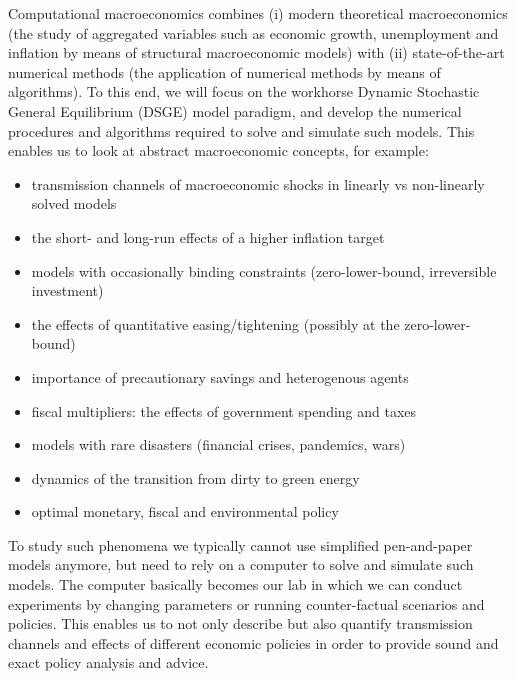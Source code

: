 Computational macroeconomics combines (i) modern theoretical macroeconomics
  (the study of aggregated variables such as economic growth, unemployment and inflation
  by means of structural macroeconomic models)
  with (ii) state-of-the-art numerical methods (the application of numerical methods by means of algorithms).
To this end, we will focus on the workhorse Dynamic Stochastic General Equilibrium (DSGE) model paradigm,
  and develop the numerical procedures and algorithms required to solve and simulate such models.
This enables us to look at abstract macroeconomic concepts, for example:
\begin{itemize}
\item transmission channels of macroeconomic shocks in linearly vs non-linearly solved models
\item the short- and long-run effects of a higher inflation target
\item models with occasionally binding constraints (zero-lower-bound, irreversible investment)
\item the effects of quantitative easing/tightening (possibly at the zero-lower-bound)
\item importance of precautionary savings and heterogenous agents
\item fiscal multipliers: the effects of government spending and taxes
\item models with rare disasters (financial crises, pandemics, wars)
\item dynamics of the transition from dirty to green energy
\item optimal monetary, fiscal and environmental policy
\end{itemize}

To study such phenomena we typically cannot use simplified pen-and-paper models anymore,
  but need to rely on a computer to solve and simulate such models.
The computer basically becomes our lab in which we can conduct experiments
  by changing parameters or running counter-factual scenarios and policies.
This enables us to not only describe but also quantify transmission channels and effects of different economic policies
  in order to provide sound and exact policy analysis and advice.

